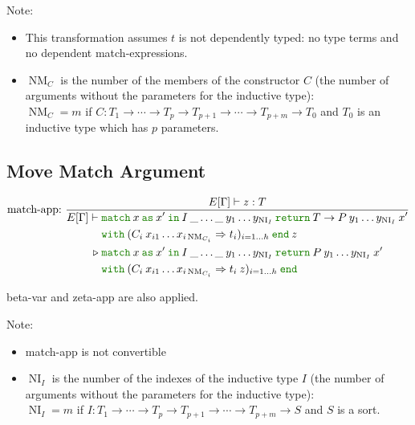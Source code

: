 \documentclass[a4paper,fleqn]{article}
\newcommand{\kwin}{\mbox{\color{mygreen}\ttfamily in}}
\newcommand{\kwmatch}{\mbox{\color{mygreen}\ttfamily match}}
\newcommand{\kwas}{\mbox{\color{mygreen}\ttfamily as}}
\newcommand{\kwreturn}{\mbox{\color{mygreen}\ttfamily return}}
\newcommand{\kwwith}{\mbox{\color{mygreen}\ttfamily with}}
\newcommand{\kwend}{\mbox{\color{mygreen}\ttfamily end}}
\DeclareMathOperator{\NI}{NI} %
\DeclareMathOperator{\NM}{NM} %
\newcommand{\reltri}{\mathrel{\triangleright}}
\begin{document}
{\small Note:
\begin{itemize}
  \item This transformation assumes $t$ is not dependently typed: no type terms and no dependent \kwmatch-expressions.
  \item $\NM_C$ is the number of the members of the constructor $C$ (the number of arguments without the parameters for the inductive type): \\
    $\NM_C=m$ if $C : T_1 \rightarrow \dotsb \rightarrow T_p \rightarrow T_{p+1} \rightarrow \dotsb \rightarrow T_{p+m} \rightarrow T_0$ and $T_0$ is an inductive type which has $p$ parameters.
\end{itemize}}

\subsection{Move Match Argument}\label{sec:move-match-argument}

\begin{gather*}
  \text{match-app:}~
    \dfrac
    {
      E[\Gamma] \vdash z : T
    }{
      \begin{aligned}
        E[\Gamma] \vdash\; &
          \kwmatch\:x\:
          \kwas\:x'\:
          \kwin\:I\:\_\ldots \_\:y_1\ldots y_{\NI_I}\:
          \kwreturn\:{T \rightarrow P\:y_1\ldots y_{\NI_I}\:x'}\\
          & \kwwith\:({C_i\: x_{i1}\ldots x_{i\NM_{C_i}}} \Rightarrow {t_i})_{i=1\ldots h}\:
          \kwend\:z \\
        \reltri\; &
          \kwmatch\:x\:
          \kwas\:x'\:
          \kwin\:I\:\_\ldots \_\:y_1\ldots y_{\NI_I}\:
          \kwreturn\:{P\:y_1\ldots y_{\NI_I}\:x'}\\
          & \kwwith\:({C_i\: x_{i1}\ldots x_{i\NM_{C_i}}} \Rightarrow {t_i\:z})_{i=1\ldots h}\:
          \kwend
      \end{aligned}
    }
\end{gather*}

beta-var and zeta-app are also applied.

{\small Note:
\begin{itemize}
  \item match-app is not convertible
  \item $\NI_I$ is the number of the indexes of the inductive type $I$ (the number of arguments without the parameters for the inductive type): \\
    $\NI_I=m$ if $I : T_1 \rightarrow \dotsb \rightarrow T_p \rightarrow T_{p+1} \rightarrow \dotsb \rightarrow T_{p+m} \rightarrow S$ and $S$ is a sort.
\end{itemize}}
\end{document}
